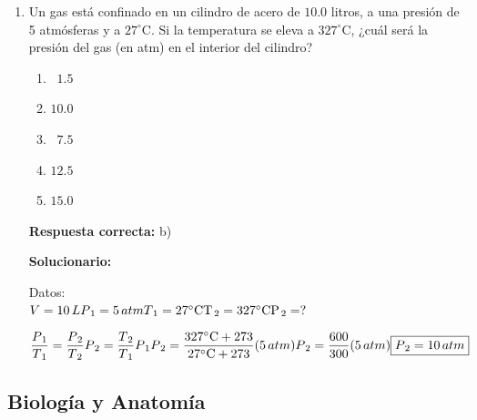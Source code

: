 \begin{enumerate}[resume]
	
	\item Un gas está confinado en un cilindro de acero de $10.0$ litros, a una presión de 5 atmósferas y a $27^\circ$C. Si la temperatura se eleva a $327^\circ$C, ¿cuál será la presión del gas (en atm) en el interior del cilindro?
	
	\begin{enumerate}[label=\alph*)]
		\item $\,\,\,1.5$
		\item $10.0$
		\item $\,\,\,7.5$
		\item $12.5$
		\item $15.0$
	\end{enumerate}
	
	\textbf{Respuesta correcta:} b)
	
	\vspace{2mm}
	\textbf{Solucionario:}
	
	
	\begin{minipage}[t]{0.45\textwidth}
		Datos:\\
		$V = 10\,L\\
		{P_{\,1}} = 5\,atm\\
		{T_{\,1}} = 27^\circ \rm{C}\\
		{T_{\,2}} = 327^\circ \rm{C}\\
		{P_{\,2}} = ?$
	\end{minipage}
	\hfill
	\begin{minipage}[t]{0.45\textwidth}
		$\dfrac{{{P_{\,1}}}}{{{T_{\,1}}}} = \dfrac{{{P_{\,2}}}}{{{T_{\,2}}}}\\\\
		{P_{\,2}} = \dfrac{{{T_{\,2}}}}{{{T_{\,1}}}}{P_{\,1}}\\\\
		{P_{\,2}} = \dfrac{{327^\circ \rm{C} + 273}}{{27^\circ \rm{C} + 273}}(5\,atm)\\\\
		{P_{\,2}} = \dfrac{{600}}{{300}}(5\,atm)\\\\
		\boxed{{P_{\,2}} = 10\,atm}$
	\end{minipage}
\end{enumerate}

\subsection*{Biología y Anatomía}

